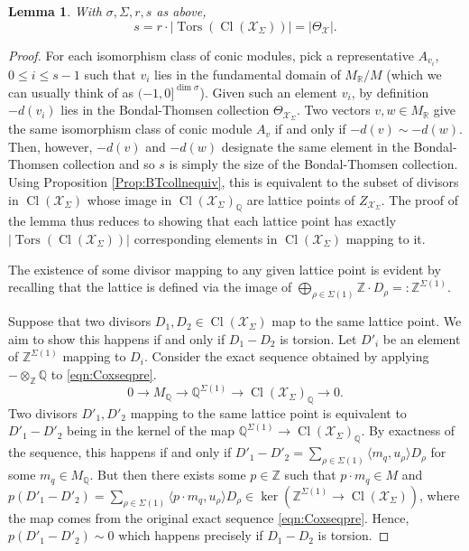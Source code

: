 \documentclass[reqno, 12pt]{amsart}
\newtheorem{lemma}[theorem]{Lemma}
\theoremstyle{definition}
\numberwithin{equation}{section}
\newcommand{\Z}{\mathbb{Z}}
\newcommand{\R}{\mathbb{R}}
\newcommand{\Q}{\mathbb{Q}}
\begin{document}
\begin{lemma}
    \label{Lem:Number of conic modules}
    With $\sigma,\Sigma, r, s$ as above, \[
    s=r\cdot |\operatorname{Tors}(\operatorname{Cl}(\mathcal{X}_\Sigma))|=|\Theta_\mathcal{X}|.
    \]
\end{lemma}
\begin{proof}
    For each isomorphism class of conic modules, pick a representative $A_{v_i}$, $0\le i\le s-1$ such that $v_i$ lies in the fundamental domain of $M_\R/M$ (which we can usually think of as $(-1,0]^{\dim\sigma}$). 
    Given such an element $v_i$, by definition $-d(v_i)$ lies in the Bondal-Thomsen collection $\Theta_{\mathcal{X}_\Sigma}$. Two vectors $v,w\in M_\R$ give the same isomorphism class of conic module $A_v$ if and only if $-d(v)\sim -d(w)$. Then, however, $-d(v)$ and $-d(w)$ designate the same element in the Bondal-Thomsen collection and so $s$ is simply the size of the Bondal-Thomsen collection. Using Proposition \ref{Prop:BTcollnequiv}, this is equivalent to the subset of divisors in $\operatorname{Cl}(\mathcal{X}_\Sigma)$ whose image in $\operatorname{Cl}(\mathcal{X}_\Sigma)_\Q$ are lattice points of $Z_{\mathcal{X}_\Sigma}$.
    The proof of the lemma thus reduces to showing that each lattice point has exactly $|\operatorname{Tors}(\operatorname{Cl}(\mathcal{X}_\Sigma))|$ corresponding elements in $\operatorname{Cl}(\mathcal{X}_\Sigma)$ mapping to it. 

    \noindent The existence of some divisor mapping to any given lattice point is evident by recalling that the lattice is defined via the image of $\bigoplus_{\rho\in \Sigma(1)}\Z\cdot D_\rho=:\Z^{\Sigma(1)}$. 
    
    \noindent Suppose that two divisors $D_1, D_2\in \operatorname{Cl}(\mathcal{X}_\Sigma)$ map to the same lattice point. We aim to show this happens if and only if $D_1-D_2$ is torsion. Let $D'_i$ be an element of $\Z^{\Sigma(1)}$ mapping to $D_i$. Consider the exact sequence obtained by applying $-\otimes_\Z\Q$ to \eqref{eqn:Coxseqpre}.
    \[
    0\rightarrow M_\Q\rightarrow \Q^{\Sigma(1)}\rightarrow \operatorname{Cl}(\mathcal{X}_\Sigma)_\Q\rightarrow 0.
    \]
    Two divisors $D'_1, D'_2$ mapping to the same lattice point is equivalent to $D'_1-D'_2$ being in the kernel of the map $\Q^{\Sigma(1)}\rightarrow \operatorname{Cl}(\mathcal{X}_\Sigma)_\Q$. By exactness of the sequence, this happens if and only if $D'_1-D'_2=\sum_{\rho\in \Sigma(1)} \langle m_q,u_\rho\rangle D_\rho$ for some $m_q\in M_\Q$. But then there exists some $p\in \Z$ such that $p\cdot m_q\in M$ and $p(D'_1-D'_2)=\sum_{\rho\in \Sigma(1)}\langle p\cdot m_q,u_\rho\rangle D_\rho\in \ker(\Z^{\Sigma(1)}\rightarrow \operatorname{Cl}(\mathcal{X}_\Sigma))$, where the map comes from the original exact sequence \eqref{eqn:Coxseqpre}. Hence, $p(D'_1-D'_2)\sim 0$ which happens precisely if $D_1-D_2$ is torsion.
\end{proof}
\end{document}
